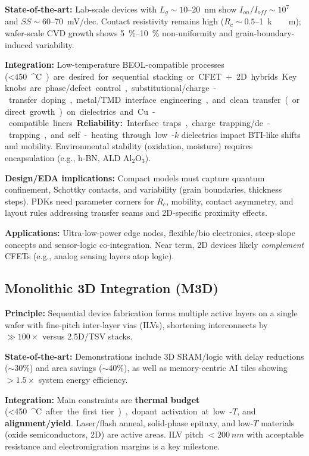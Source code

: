 \documentclass[conference]{IEEEtran}
\begin{document}
\textbf{State-of-the-art:}
Lab-scale devices with $L_g\!\sim\!10$--\SI{20}{nm} show $I_{on}/I_{off}\!\sim\!10^7$ and $SS\!\sim\!60$--\SI{70}{mV/dec}.
Contact resistivity remains high ($R_c\!\sim\!0.5$--\SI{1}{k\Omega\cdot\mu m}); wafer-scale CVD growth shows \SI{5}{\%}--\SI{10}{\%} non-uniformity and grain-boundary-induced variability.

\textbf{Integration:}
Low-temperature BEOL-compatible processes (\SI{<450}{^\circ C}) are desired for sequential stacking or CFET+2D hybrids.
Key knobs are phase/defect control, substitutional/charge-transfer doping, metal/TMD interface engineering, and clean transfer (or direct growth) on dielectrics and Cu-compatible liners.

\textbf{Reliability:}
Interface traps, charge trapping/de-trapping, and self-heating through low-$k$ dielectrics impact BTI-like shifts and mobility.
Environmental stability (oxidation, moisture) requires encapsulation (e.g., h-BN, ALD Al$_2$O$_3$).

\textbf{Design/EDA implications:}
Compact models must capture quantum confinement, Schottky contacts, and variability (grain boundaries, thickness steps).
PDKs need parameter corners for $R_c$, mobility, contact asymmetry, and layout rules addressing transfer seams and 2D-specific proximity effects.

\textbf{Applications:}
Ultra-low-power edge nodes, flexible/bio electronics, steep-slope concepts and sensor-logic co-integration.
Near term, 2D devices likely \emph{complement} CFETs (e.g., analog sensing layers atop logic).

\subsection{Monolithic 3D Integration (M3D)}
\textbf{Principle:}
Sequential device fabrication forms multiple active layers on a single wafer with fine-pitch inter-layer vias (ILVs), shortening interconnects by \(\gg\!100\times\) versus 2.5D/TSV stacks.

\textbf{State-of-the-art:}
Demonstrations include 3D SRAM/logic with delay reductions ($\sim$30\%) and area savings ($\sim$40\%), as well as memory-centric AI tiles showing $>\!1.5\times$ system energy efficiency.

\textbf{Integration:}
Main constraints are \textbf{thermal budget} (\SI{<450}{^\circ C} after the first tier), dopant activation at low-$T$, and \textbf{alignment/yield}.
Laser/flash anneal, solid-phase epitaxy, and low-$T$ materials (oxide semiconductors, 2D) are active areas.
ILV pitch $<\SI{200}{nm}$ with acceptable resistance and electromigration margins is a key milestone.
\end{document}
